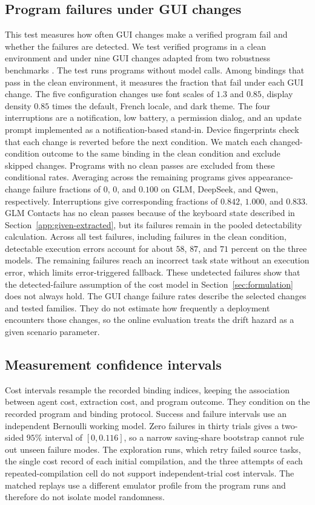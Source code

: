 \subsection{Program failures under GUI changes}
\label{sec:fragility}
This test measures how often GUI changes make a verified program fail and whether the failures are detected.
We test verified programs in a clean environment and under nine GUI changes adapted from two robustness benchmarks \citep{lee2025bmoca,chen2026dgara}.
The test runs programs without model calls.
Among bindings that pass in the clean environment, it measures the fraction that fail under each GUI change.
The five configuration changes use font scales of $1.3$ and $0.85$, display density $0.85$ times the default, French locale, and dark theme.
The four interruptions are a notification, low battery, a permission dialog, and an update prompt implemented as a notification-based stand-in.
Device fingerprints check that each change is reverted before the next condition.
We match each changed-condition outcome to the same binding in the clean condition and exclude skipped changes.
Programs with no clean passes are excluded from these conditional rates.
Averaging across the remaining programs gives appearance-change failure fractions of $0$, $0$, and $0.100$ on GLM, DeepSeek, and Qwen, respectively.
Interruptions give corresponding fractions of $0.842$, $1.000$, and $0.833$.
GLM Contacts has no clean passes because of the keyboard state described in Section~\ref{app:given-extracted}, but its failures remain in the pooled detectability calculation.
Across all test failures, including failures in the clean condition, detectable execution errors account for about $58$, $87$, and $71$ percent on the three models.
The remaining failures reach an incorrect task state without an execution error, which limits error-triggered fallback.
These undetected failures show that the detected-failure assumption of the cost model in Section~\ref{sec:formulation} does not always hold.
The GUI change failure rates describe the selected changes and tested families.
They do not estimate how frequently a deployment encounters those changes, so the online evaluation treats the drift hazard as a given scenario parameter.


\subsection{Measurement confidence intervals}
\label{app:measurement-uncertainty}
Cost intervals resample the recorded binding indices, keeping the association between agent cost, extraction cost, and program outcome.
They condition on the recorded program and binding protocol.
Success and failure intervals use an independent Bernoulli working model.
Zero failures in thirty trials gives a two-sided $95\%$ interval of $[0,0.116]$, so a narrow saving-share bootstrap cannot rule out unseen failure modes.
The exploration runs, which retry failed source tasks, the single cost record of each initial compilation, and the three attempts of each repeated-compilation cell do not support independent-trial cost intervals.
The matched replays use a different emulator profile from the program runs and therefore do not isolate model randomness.

